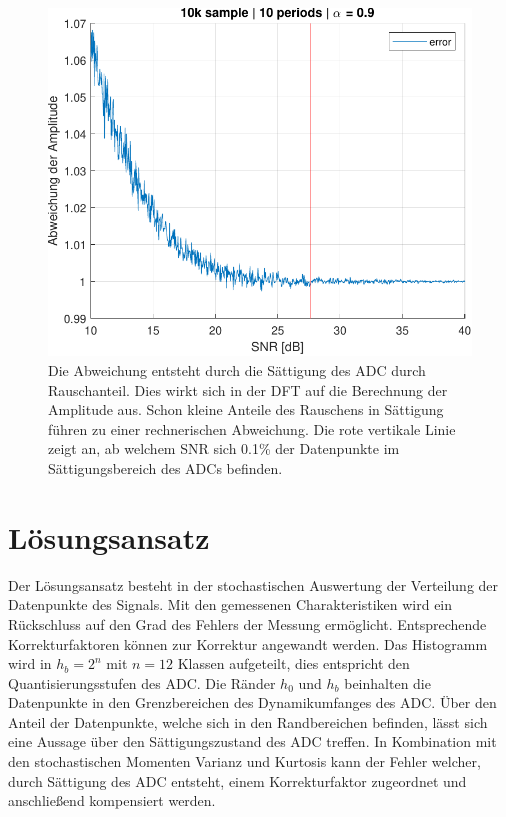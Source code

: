 \begin{figure}[h!] 
	\centering 
	\includegraphics[width=.8\columnwidth]{../img/noise-err.pdf}
	\caption{Die Abweichung entsteht durch die Sättigung des ADC durch Rauschanteil. Dies wirkt sich in der DFT auf die Berechnung der Amplitude aus. Schon kleine Anteile des Rauschens in Sättigung führen zu einer rechnerischen Abweichung. Die rote vertikale Linie zeigt an, ab welchem SNR sich 0.1\% der Datenpunkte im Sättigungsbereich des ADCs befinden.}
	\label{fig:Rauschanteil}
\end{figure}

\section{Lösungsansatz} 
 
Der Lösungsansatz besteht in der stochastischen Auswertung der Verteilung der Datenpunkte des Signals. Mit den gemessenen Charakteristiken wird ein Rückschluss auf den Grad des Fehlers der Messung ermöglicht. Entsprechende Korrekturfaktoren können zur Korrektur angewandt werden. Das Histogramm wird in $h_b = 2^n$ mit $n = 12$ Klassen aufgeteilt, dies entspricht den Quantisierungsstufen des ADC. Die Ränder $h_0$ und $h_b$ beinhalten die Datenpunkte in den Grenzbereichen des Dynamikumfanges des ADC. Über den Anteil der Datenpunkte, welche sich in den Randbereichen befinden, lässt sich eine Aussage über den Sättigungszustand des ADC treffen. In Kombination mit den stochastischen Momenten Varianz und Kurtosis kann der Fehler welcher, durch Sättigung des ADC entsteht, einem Korrekturfaktor zugeordnet und anschließend kompensiert werden. 


